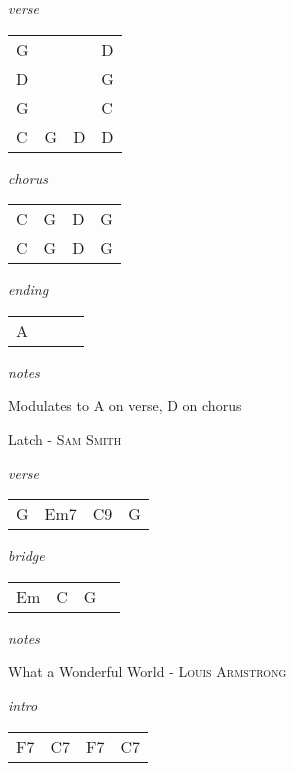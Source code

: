\documentclass[12pt]{article}
\begin{document}
\textit{verse}

\begin{tabular}{|P{1.25in}|P{1.25in}|P{1.25in}|P{1.25in}|}
  G &   &   &  D \\
  D &   &   &  G \\
  G &   &   &  C \\
  C & G & D &  D \\ 
\end{tabular}

\textit{chorus}

\begin{tabular}{|P{1.25in}|P{1.25in}|P{1.25in}|P{1.25in}|}
  C & G  & D  &  G \\
  C & G  & D  &  G
\end{tabular}

\textit{ending}

\begin{tabular}{|P{1.25in}|P{1.25in}|P{1.25in}|P{1.25in}|}
  A &   &   &   \\
\end{tabular}

\textit{notes}

Modulates to A on verse, D on chorus

\newpage

{\Huge Latch} {\huge - \textsc{Sam Smith}}

\huge
\textit{verse}

\begin{tabular}{|P{1.25in}|P{1.25in}|P{1.25in}|P{1.25in}|}
   G &  Em7 & C9  &  G \\
\end{tabular}

\textit{bridge}

\begin{tabular}{|P{1.25in}|P{1.25in}|P{1.25in}|P{1.25in}|}
   Em &  C &  G &   \\
\end{tabular}

\textit{notes}

\newpage


{\Huge What a Wonderful World} {\huge - \textsc{Louis Armstrong}}

\huge
\textit{intro}

\begin{tabular}{|P{1.25in}|P{1.25in}|P{1.25in}|P{1.25in}|}
  F7 & C7  & F7  &  C7 \\
\end{tabular}
\end{document}
